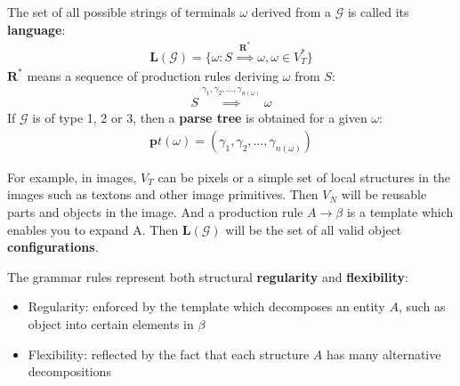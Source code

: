 \documentclass[10pt,oneside]{book}
\begin{document}
The set of all possible strings of terminals $\omega$ derived from a
$\mathcal{G}$ is called its \textbf{language}:
%
\begin{align}
  \label{eq:ii.1.3}
  \mathbf{L}(\mathcal{G}) = \{\omega: S \overset{\mathbf{R^*}}{\implies} \omega, \omega \in V^*_T\}
\end{align}
%
$\mathbf{R^*}$ means a sequence of production rules deriving $\omega$ from $S$:
%
\begin{align}
  \label{eq:ii.1.4}
  S \overset{\gamma_1, \gamma_2, \ldots, \gamma_{n(\omega)}}{\implies} \omega
\end{align}
%
If $\mathcal{G}$ is of type 1, 2 or 3, then a \textbf{parse tree} is obtained
for a given $\omega$:
%
\begin{align}
  \label{eq:ii.1.5}
  \mathbf{p}t(\omega) = (\gamma_1, \gamma_2, \ldots, \gamma_{n(\omega)})
\end{align}
%

For example, in images, $V_T$ can be pixels or a simple set of local structures
in the images such as textons and other image primitives. Then $V_N$ will be
reusable parts and objects in the image. And a production rule
$A \rightarrow \beta$ is a template which enables you to expand A. Then
$\mathbf{L}(\mathcal{G})$ will be the set of all valid object
\textbf{configurations}.

The grammar rules represent both structural \textbf{regularity} and
\textbf{flexibility}:
%
\begin{itemize}
  \item Regularity: enforced by the template which decomposes an entity $A$,
    such as object into certain elements in $\beta$
  \item Flexibility: reflected by the fact that each structure $A$ has many
    alternative decompositions
\end{itemize}
%
\end{document}
